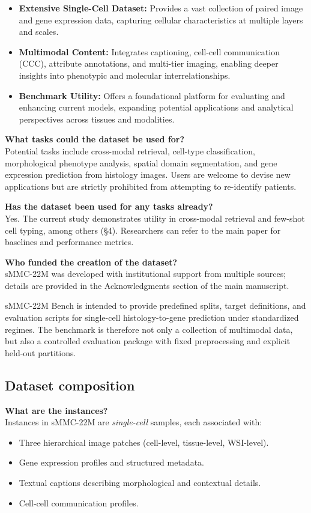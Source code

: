 \documentclass{article}
\newcommand{\dataset}{sMMC-22M\xspace}
\begin{document}
\begin{itemize}
    \item \textbf{Extensive Single-Cell Dataset:} Provides a vast collection of paired image and gene expression data, capturing cellular characteristics at multiple layers and scales.
    \item \textbf{Multimodal Content:} Integrates captioning, cell-cell communication (CCC), attribute annotations, and multi-tier imaging, enabling deeper insights into phenotypic and molecular interrelationships.
    \item \textbf{Benchmark Utility:} Offers a foundational platform for evaluating and enhancing current models, expanding potential applications and analytical perspectives across tissues and modalities.
\end{itemize}
\noindent
\textbf{What tasks could the dataset be used for?} \\
Potential tasks include cross-modal retrieval, cell-type classification, morphological phenotype analysis, spatial domain segmentation, and gene expression prediction from histology images. Users are welcome to devise new applications but are strictly prohibited from attempting to re-identify patients.

\noindent
\textbf{Has the dataset been used for any tasks already?} \\
Yes. The current study demonstrates utility in cross-modal retrieval and few-shot cell typing, among others (\S4). Researchers can refer to the main paper for baselines and performance metrics.

\noindent
\textbf{Who funded the creation of the dataset?} \\
\dataset was developed with institutional support from multiple sources; details are provided in the Acknowledgments section of the main manuscript.

\dataset Bench is intended to provide predefined splits, target definitions, and evaluation scripts for single-cell histology-to-gene prediction under standardized regimes. The benchmark is therefore not only a collection of multimodal data, but also a controlled evaluation package with fixed preprocessing and explicit held-out partitions.


\subsection{Dataset composition}
\noindent
\textbf{What are the instances?} \\
Instances in \dataset are \textit{single-cell} samples, each associated with:
\begin{itemize}
    \item Three hierarchical image patches (cell-level, tissue-level, WSI-level).
    \item Gene expression profiles and structured metadata.
    \item Textual captions describing morphological and contextual details.
    \item Cell-cell communication profiles.
\end{itemize}
\end{document}
